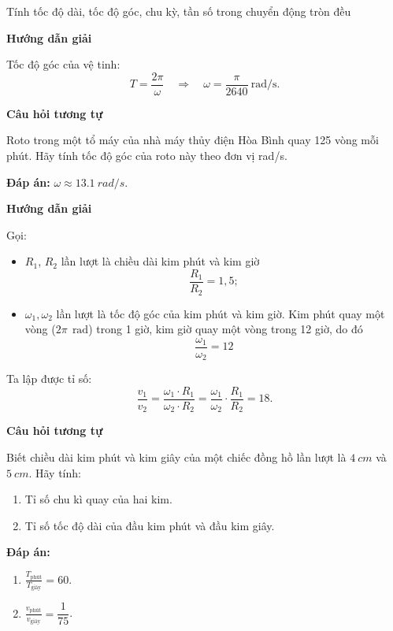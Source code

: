 \begin{dang}{Tính tốc độ dài, tốc độ góc, chu kỳ, tần số trong chuyển động tròn đều}
	{	\begin{center}
			\textbf{Hướng dẫn giải}
		\end{center}
		Tốc độ góc của vệ tinh:
		$$T=\frac{2\pi}{\omega} \quad\Rightarrow\quad \omega = \frac{\pi}{2640}\ \text{rad/s}.$$ 
		
		\begin{center}
			\textbf{Câu hỏi tương tự}
		\end{center}
		
		Roto trong một tổ máy của nhà máy thủy điện Hòa Bình quay 125 vòng mỗi phút. Hãy tính tốc độ góc của roto này theo đơn vị rad/s.
		
		\textbf{Đáp án:} $\omega \approx \SI{13.1}{rad/s}$.
	}
	
	{	\begin{center}
			\textbf{Hướng dẫn giải}
		\end{center}
		
		Gọi: 
		\begin{itemize}
			\item  $R_1$, $R_2$ lần lượt là chiều dài kim phút và kim giờ
			$$\dfrac{R_1}{R_2}=1,5;$$
			\item $\omega_1, \omega_2$ lần lượt là tốc độ góc của kim phút và kim giờ. Kim phút quay một vòng ($2\pi\ \SI{}{\radian}$) trong 1 giờ, kim giờ quay một vòng trong 12 giờ, do đó 
			$$
			\dfrac{\omega_1}{\omega_2}=12
			$$
		\end{itemize}
		
		
		Ta lập được tỉ số: $$\dfrac{v_1}{v_2}=\dfrac{\omega_1 \cdot R_1}{\omega_2 \cdot R_2}=\dfrac{\omega_1}{\omega_2}\cdot\dfrac{R_1}{R_2}=18.$$
		
		\begin{center}
			\textbf{Câu hỏi tương tự}
		\end{center}
		
		Biết chiều dài kim phút và kim giây của một chiếc đồng hồ lần lượt là $\SI{4}{cm}$ và $\SI{5}{cm}$. Hãy tính:
		\begin{enumerate}[label=\alph*)]
			\item Tỉ số chu kì quay của hai kim.
			\item Tỉ số tốc độ dài của đầu kim phút và đầu kim giây.
		\end{enumerate}
		
		\textbf{Đáp án:}
		\begin{enumerate}[label=\alph*)]
			\item $\frac{T_\text{phút}}{T_\text{giây}}=60$.
			\item $\frac{v_\text{phút}}{v_\text{giây}}=\dfrac{1}{75}$.
		\end{enumerate}
	}
	
	
	
\end{dang}

